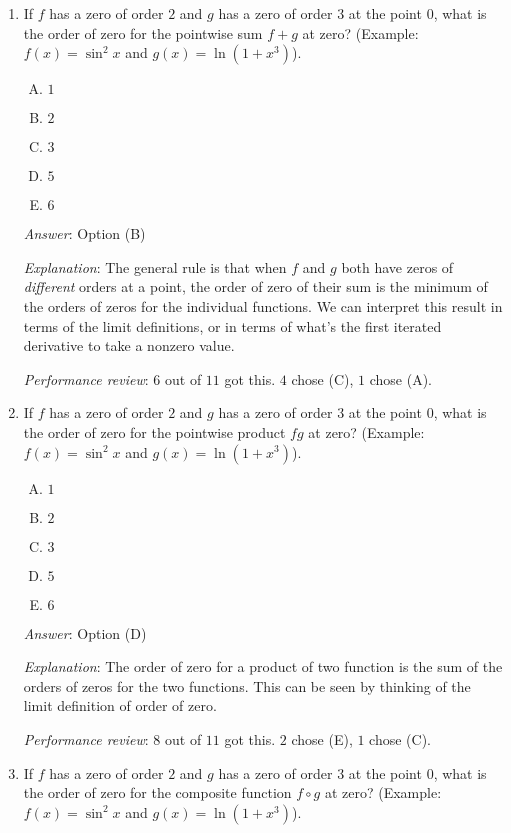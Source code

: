 \documentclass[10pt]{amsart}
\begin{document}
\begin{enumerate}
\item If $f$ has a zero of order $2$ and $g$ has a zero of order $3$
  at the point $0$, what is the order of zero for the pointwise sum $f
  + g$ at zero?  (Example: $f(x) = \sin^2x$ and $g(x) = \ln(1 +
  x^3)$).

  \begin{enumerate}[(A)]
  \item $1$
  \item $2$
  \item $3$
  \item $5$
  \item $6$
  \end{enumerate}

  {\em Answer}: Option (B)

  {\em Explanation}: The general rule is that when $f$ and $g$ both
  have zeros of {\em different} orders at a point, the order of zero
  of their sum is the minimum of the orders of zeros for the individual
  functions. We can interpret this result in terms of the limit
  definitions, or in terms of what's the first iterated derivative to
  take a nonzero value.

  {\em Performance review}: $6$ out of $11$ got this. $4$ chose (C),
  $1$ chose (A).
\item If $f$ has a zero of order $2$ and $g$ has a zero of order $3$
  at the point $0$, what is the order of zero for the pointwise
  product $fg$ at zero?  (Example: $f(x) = \sin^2x$ and $g(x) = \ln(1
  + x^3)$).

  \begin{enumerate}[(A)]
  \item $1$
  \item $2$
  \item $3$
  \item $5$
  \item $6$
  \end{enumerate}

  {\em Answer}: Option (D)

  {\em Explanation}: The order of zero for a product of two function
  is the sum of the orders of zeros for the two functions. This can be
  seen by thinking of the limit definition of order of zero.

  {\em Performance review}: $8$ out of $11$ got this. $2$ chose (E),
  $1$ chose (C).
\item If $f$ has a zero of order $2$ and $g$ has a zero of order $3$
  at the point $0$, what is the order of zero for the composite
  function $f \circ g$ at zero?  (Example: $f(x) = \sin^2x$ and $g(x) =
  \ln(1 + x^3)$).


\end{enumerate}
\end{document}
